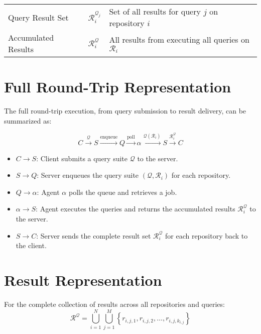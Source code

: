 \documentclass[11pt]{article}
\begin{document}
\begin{center}
\begin{tabular}{lll}
        Query Result Set                                                              & \(\mathcal{R}_i^{\mathcal{Q}_j}\) & Set of all results for query \(j\) on repository \(i\)              \\[0pt]
        Accumulated Results                                                           & \(\mathcal{R}_i^{\mathcal{Q}}\)   & All results from executing all queries on \(\mathcal{R}_i\)         \\[0pt]
    \end{tabular}
\end{center}


\section{Full Round-Trip Representation}
\label{sec:full-round-trip}
The full round-trip execution, from query submission to result delivery, can be summarized as:

\[
    C \xrightarrow{\mathcal{Q}} S \xrightarrow{\text{enqueue}} Q
    \xrightarrow{\text{poll}}
    \alpha \xrightarrow{\mathcal{Q}(\mathcal{R}_i)} S \xrightarrow{\mathcal{R}_i^{\mathcal{Q}}} C
\]

\begin{itemize}
    \item \(C \to S\): Client submits a query suite \(\mathcal{Q}\) to the server.
    \item \(S \to Q\): Server enqueues the query suite \((\mathcal{Q}, \mathcal{R}_i)\) for each repository.
    \item \(Q \to \alpha\): Agent \(\alpha\) polls the queue and retrieves a job.
    \item \(\alpha \to S\): Agent executes the queries and returns the accumulated results \(\mathcal{R}_i^{\mathcal{Q}}\) to the server.
    \item \(S \to C\): Server sends the complete result set \(\mathcal{R}_i^{\mathcal{Q}}\) for each repository back to the client.
\end{itemize}

\section{Result Representation}

For the complete collection of results across all repositories and queries:
\[
  \mathcal{R}^{\mathcal{Q}} = \bigcup_{i=1}^{N} \bigcup_{j=1}^{M}
  \left\{ r_{i,j,1}, r_{i,j,2}, \dots, r_{i,j,k_{i,j}} \right\}
\]
\end{document}
